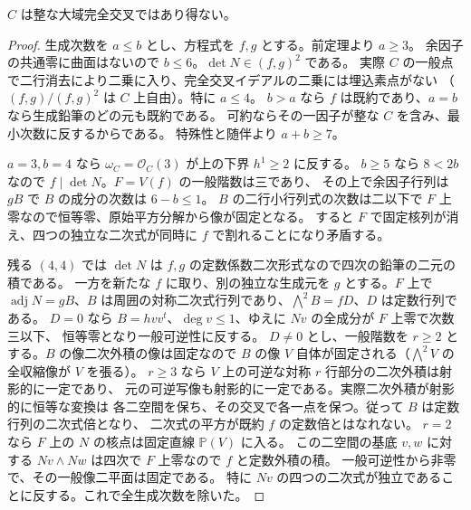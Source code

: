\begin{theorem}\label{thm:cofactor-no-integral-ci}
$C$ は整な大域完全交叉ではあり得ない。
\end{theorem}
\begin{proof}
生成次数を $a\le b$ とし、方程式を $f,g$ とする。前定理より $a\ge3$。
余因子の共通零に曲面はないので $b\le6$。$\det N\in(f,g)^2$ である。
実際 $C$ の一般点で二行消去により二乗に入り、完全交叉イデアルの二乗には埋込素点がない
（$(f,g)/(f,g)^2$ は $C$ 上自由）。特に $a\le4$。
$b>a$ なら $f$ は既約であり、$a=b$ なら生成鉛筆のどの元も既約である。
可約ならその一因子が整な $C$ を含み、最小次数に反するからである。
特殊性と随伴より $a+b\ge7$。

$a=3,b=4$ なら $\omega_C=\mathcal O_C(3)$ が上の下界 $h^1\ge2$ に反する。
$b\ge5$ なら $8<2b$ なので $f\mid\det N$。$F=V(f)$ の一般階数は三であり、
その上で余因子行列は $gB$ で $B$ の成分の次数は $6-b\le1$。
$B$ の二行小行列式の次数は二以下で $F$ 上零なので恒等零、原始平方分解から像が固定となる。
すると $F$ で固定核列が消え、四つの独立な二次式が同時に $f$ で割れることになり矛盾する。

残る $(4,4)$ では $\det N$ は $f,g$ の定数係数二次形式なので四次の鉛筆の二元の積である。
一方を新たな $f$ に取り、別の独立な生成元を $g$ とする。$F$ 上で
$\operatorname{adj}N=gB$、$B$ は周囲の対称二次式行列であり、$\bigwedge^2 B=fD$、$D$ は定数行列である。
$D=0$ なら $B=hvv^t$、$\deg v\le1$、ゆえに $Nv$ の全成分が $F$ 上零で次数三以下、
恒等零となり一般可逆性に反する。
$D\ne0$ とし、一般階数を $r\ge2$ とする。$B$ の像二次外積の像は固定なので
$B$ の像 $V$ 自体が固定される（$\bigwedge^2 V$ の全収縮像が $V$ を張る）。
$r\ge3$ なら $V$ 上の可逆な対称 $r$ 行部分の二次外積は射影的に一定であり、
元の可逆写像も射影的に一定である。実際二次外積が射影的に恒等な変換は
各二空間を保ち、その交叉で各一点を保つ。従って $B$ は定数行列の二次式倍となり、
二次式の平方が既約 $f$ の定数倍とはなれない。
$r=2$ なら $F$ 上の $N$ の核点は固定直線 $\mathbb P(V)$ に入る。
この二空間の基底 $v,w$ に対する $Nv\wedge Nw$ は四次で $F$ 上零なので $f$ と定数外積の積。
一般可逆性から非零で、その一般像二平面は固定である。
特に $Nv$ の四つの二次式が独立であることに反する。これで全生成次数を除いた。
\end{proof}
